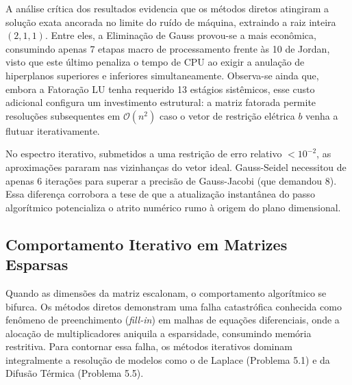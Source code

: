 \begin{table}[H]
\centering
\caption{Desempenho Global na Resolução do Circuito (Problema 5.2)}
\label{tab:comparativo_52}
\end{table}

A análise crítica dos resultados evidencia que os métodos diretos atingiram a solução exata ancorada no limite do ruído de máquina, extraindo a raiz inteira $(2, 1, 1)$. Entre eles, a Eliminação de Gauss provou-se a mais econômica, consumindo apenas 7 etapas macro de processamento frente às 10 de Jordan, visto que este último penaliza o tempo de CPU ao exigir a anulação de hiperplanos superiores e inferiores simultaneamente. Observa-se ainda que, embora a Fatoração LU tenha requerido 13 estágios sistêmicos, esse custo adicional configura um investimento estrutural: a matriz fatorada permite resoluções subsequentes em $\mathcal{O}(n^2)$ caso o vetor de restrição elétrica $b$ venha a flutuar iterativamente.

No espectro iterativo, submetidos a uma restrição de erro relativo $< 10^{-2}$, as aproximações pararam nas vizinhanças do vetor ideal. Gauss-Seidel necessitou de apenas 6 iterações para superar a precisão de Gauss-Jacobi (que demandou 8). Essa diferença corrobora a tese de que a atualização instantânea do passo algorítmico potencializa o atrito numérico rumo à origem do plano dimensional.

\subsection{Comportamento Iterativo em Matrizes Esparsas}

Quando as dimensões da matriz escalonam, o comportamento algorítmico se bifurca. Os métodos diretos demonstram uma falha catastrófica conhecida como fenômeno de preenchimento (\textit{fill-in}) em malhas de equações diferenciais, onde a alocação de multiplicadores aniquila a esparsidade, consumindo memória restritiva. Para contornar essa falha, os métodos iterativos dominam integralmente a resolução de modelos como o de Laplace (Problema 5.1) e da Difusão Térmica (Problema 5.5).

